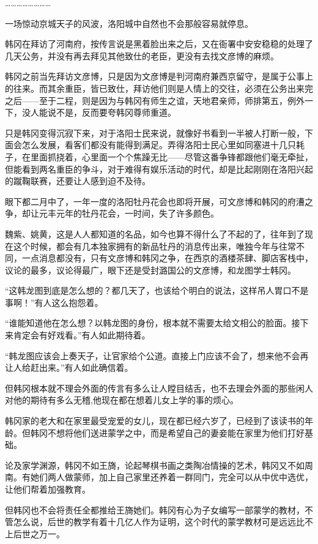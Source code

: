 ……………………

一场惊动京城天子的风波，洛阳城中自然也不会那般容易就停息。

韩冈在拜访了河南府，按传言说是黑着脸出来之后，又在衙署中安安稳稳的处理了几天公务，并没有再去拜见其他致仕的老臣，更没有去找文彦博的麻烦。

韩冈之前当先拜访文彦博，只是因为文彦博是判河南府兼西京留守，是属于公事上的往来。而其余重臣，皆已致仕，拜访他们则是人情上的交往，必须在公务出来完之后——至于二程，则是因为与韩冈有师生之谊，天地君亲师，师排第五，例外一下，没人能说不是，反而要夸韩冈尊师重道。

只是韩冈变得沉寂下来，对于洛阳士民来说，就像好书看到一半被人打断一般，下面会怎么发展，看客们都没有能得到满足。弄得洛阳士民心里如同塞进十几只耗子，在里面抓挠着，心里面一个个焦躁无比——尽管这番争锋都跟他们毫无牵扯，但能看到两名重臣的争斗，对于难得有娱乐活动的时代，却是比起刚刚在洛阳兴起的蹴鞠联赛，还要让人感到迫不及待。

眼下都二月中了，一年一度的洛阳牡丹花会也即将开展，可文彦博和韩冈的府漕之争，却让元丰元年的牡丹花会，一时间，失了许多颜色。

魏紫、姚黄，这是人人都知道的名品，如今也算不得什么了不起的了，往年到了现在这个时候，都会有几本独家拥有的新品牡丹的消息传出来，唯独今年与往常不同，一点消息都没有，只有文彦博和韩冈之争，在西京的酒楼茶肆、脚店客栈中，议论的最多，议论得最广，眼下还是受封潞国公的文彦博，和龙图学士韩冈。

“这韩龙图到底是怎么想的？都几天了，也该给个明白的说法，这样吊人胃口不是事啊！”有人这么抱怨着。

“谁能知道他在怎么想？以韩龙图的身份，根本就不需要太给文相公的脸面。接下来肯定会有好戏看。”有人如此期待着。

“韩龙图应该会上奏天子，让官家给个公道。直接上门应该不会了，想来他不会再让人给赶出来。”有人如此确信着。

但韩冈根本就不理会外面的传言有多么让人瞠目结舌，也不去理会外面的那些闲人对他的期待有多么无稽,他现在都在想着儿女上学的事的烦心。

韩冈家的老大和在家里最受宠爱的女儿，现在都已经六岁了，已经到了该读书的年龄。但韩冈不想将他们送进蒙学之中，而是希望自己的妻妾能在家里为他们打好基础。

论及家学渊源，韩冈不如王旖，论起琴棋书画之类陶冶情操的艺术，韩冈又不如周南。有她们两人做蒙师，加上自己家里还养着一群同门，完全可以从中优中选优，让他们帮着加强教育。

但韩冈也不会将责任全都推给王旖她们。韩冈有心为子女编写一部蒙学的教材，不管怎么说，后世的教学有着十几亿人作为证明，这个时代的蒙学教材可是远远比不上后世之万一。

